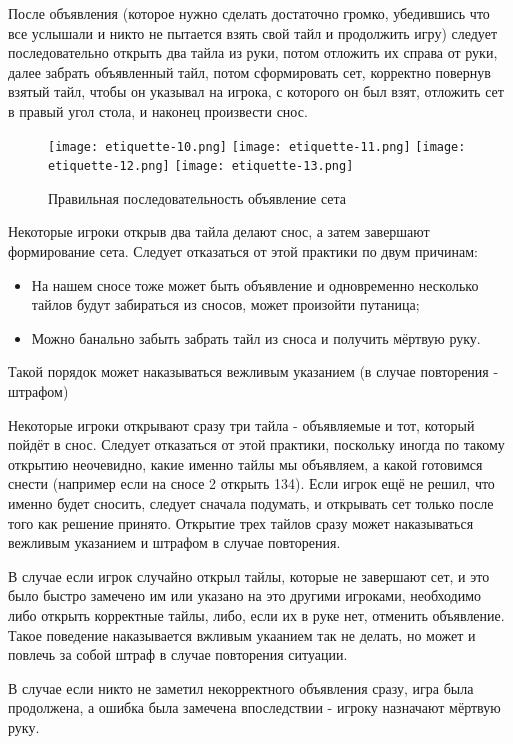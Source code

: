 После объявления (которое нужно сделать достаточно громко, убедившись что все услышали и никто не пытается взять свой тайл и продолжить игру) следует последовательно открыть два тайла из руки, потом отложить их справа от руки, далее забрать объявленный тайл, потом сформировать сет, корректно повернув взятый тайл, чтобы он указывал на игрока, с которого он был взят, отложить сет в правый угол стола, и наконец произвести снос.

\begin{figure}[H]
	\centering
	\texttt{[image: etiquette-10.png]}
	\texttt{[image: etiquette-11.png]}
	\texttt{[image: etiquette-12.png]}
	\texttt{[image: etiquette-13.png]}
	\caption{Правильная последовательность объявление сета}
\end{figure}

Некоторые игроки открыв два тайла делают снос, а затем завершают формирование сета. Следует отказаться от этой практики по двум причинам:
\begin{itemize}
	\item На нашем сносе тоже может быть объявление и одновременно несколько тайлов будут забираться из сносов, может произойти путаница;
	\item Можно банально забыть забрать тайл из сноса и получить мёртвую руку.
\end{itemize}

Такой порядок может наказываться вежливым указанием (в случае повторения - штрафом)

Некоторые игроки открывают сразу три тайла - объявляемые и тот, который пойдёт в снос. Следует отказаться от этой практики, поскольку иногда по такому открытию неочевидно, какие именно тайлы мы объявляем, а какой готовимся снести (например если на сносе 2 открыть 134). Если игрок ещё не решил, что именно будет сносить, следует сначала подумать, и открывать сет только после того как решение принято. Открытие трех тайлов сразу может наказываться вежливым указанием и штрафом в случае повторения.

В случае если игрок случайно открыл тайлы, которые не завершают сет, и это было быстро замечено им или указано на это другими игроками, необходимо либо открыть корректные тайлы, либо, если их в руке нет, отменить объявление. Такое поведение наказывается вжливым укаанием так не делать, но может и повлечь за собой штраф в случае повторения ситуации.

В случае если никто не заметил некорректного объявления сразу, игра была продолжена, а ошибка была замечена впоследствии - игроку назначают мёртвую руку.

